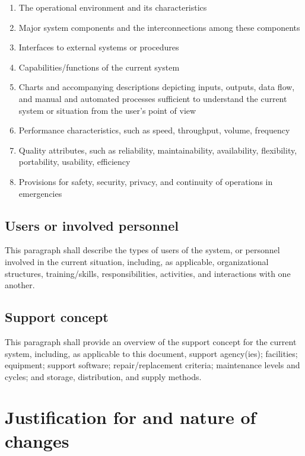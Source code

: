\documentclass{fidata-report-template}
\begin{document}
\begin{enumerate}
\itemsep1pt\parskip0pt
\item
  The operational environment and its characteristics
\item
  Major system components and the interconnections among these
  components
\item
  Interfaces to external systems or procedures
\item
  Capabilities/functions of the current system
\item
  Charts and accompanying descriptions depicting inputs, outputs, data
  flow, and manual and automated processes sufficient to understand the
  current system or situation from the user's point of view
\item
  Performance characteristics, such as speed, throughput, volume,
  frequency
\item
  Quality attributes, such as reliability, maintainability,
  availability, flexibility, portability, usability, efficiency
\item
  Provisions for safety, security, privacy, and continuity of operations
  in emergencies
\end{enumerate}

\subsection{Users or involved personnel}

This paragraph shall describe the types of users of the system, or
personnel involved in the current situation, including, as applicable,
organizational structures, training/skills, responsibilities,
activities, and interactions with one another.

\subsection{Support concept}

This paragraph shall provide an overview of the support concept for the
current system, including, as applicable to this document, support
agency(ies); facilities; equipment; support software; repair/replacement
criteria; maintenance levels and cycles; and storage, distribution, and
supply methods.

\section{Justification for and nature of changes}
\end{document}

